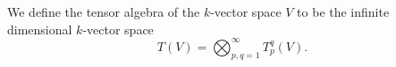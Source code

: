 \begin{definition}\label{def: tensor algebra vs}
    We define the tensor algebra of the \(k\)-vector space \(V\) to be the
    infinite dimensional \(k\)-vector space
    \[
        T(V) = \bigotimes_{p, q = 1}^\infty T_p^q(V).
    \]
\end{definition}

